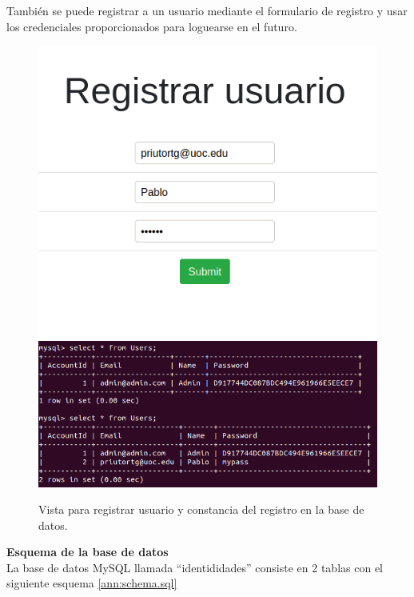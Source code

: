 \documentclass[a4paper,oneside]{article}
\begin{document}
\begin{enumerate}[label=\textbf{\alph*)}]
También se puede registrar a un usuario mediante el formulario de registro y usar los credenciales proporcionados para loguearse en el futuro.
\begin{figure}[h!]
  \centering
  \includegraphics[scale=0.5]{images/register2.png}\\
  \includegraphics[scale=0.5]{images/select_users.png}\\
  \caption{Vista para registrar usuario y constancia del registro en la base de datos.}
  \label{fig:register}
\end{figure}
\vspace{.5cm}

\textbf{Esquema de la base de datos}\\

La base de datos MySQL llamada ``identididades'' consiste en 2 tablas con el siguiente esquema \ref{ann:schema.sql}\\


\end{enumerate}
\end{document}
